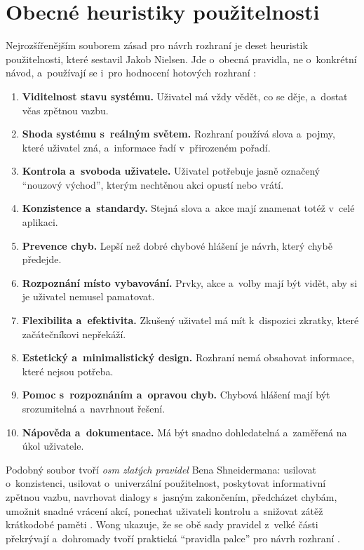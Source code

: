 \section{Obecné heuristiky použitelnosti}\label{sec:ui-heuristiky}

Nejrozšířenějším souborem zásad pro návrh rozhraní je deset heuristik použitelnosti, které sestavil Jakob Nielsen. Jde o~obecná pravidla, ne o~konkrétní návod, a~používají se i~pro hodnocení hotových rozhraní \cite{Nielsen-heuristiky}:
\begin{enumerate}
\item \textbf{Viditelnost stavu systému.} Uživatel má vždy vědět, co se děje, a~dostat včas zpětnou vazbu.
\item \textbf{Shoda systému s~reálným světem.} Rozhraní používá slova a~pojmy, které uživatel zná, a~informace řadí v~přirozeném pořadí.
\item \textbf{Kontrola a~svoboda uživatele.} Uživatel potřebuje jasně označený \enquote{nouzový východ}, kterým nechtěnou akci opustí nebo vrátí.
\item \textbf{Konzistence a~standardy.} Stejná slova a~akce mají znamenat totéž v~celé aplikaci.
\item \textbf{Prevence chyb.} Lepší než dobré chybové hlášení je návrh, který chybě předejde.
\item \textbf{Rozpoznání místo vybavování.} Prvky, akce a~volby mají být vidět, aby si je uživatel nemusel pamatovat.
\item \textbf{Flexibilita a~efektivita.} Zkušený uživatel má mít k~dispozici zkratky, které začátečníkovi nepřekáží.
\item \textbf{Estetický a~minimalistický design.} Rozhraní nemá obsahovat informace, které nejsou potřeba.
\item \textbf{Pomoc s~rozpoznáním a~opravou chyb.} Chybová hlášení mají být srozumitelná a~navrhnout řešení.
\item \textbf{Nápověda a~dokumentace.} Má být snadno dohledatelná a~zaměřená na úkol uživatele.
\end{enumerate}

Podobný soubor tvoří \emph{osm zlatých pravidel} Bena Shneidermana: usilovat o~konzistenci, usilovat o~univerzální použitelnost, poskytovat informativní zpětnou vazbu, navrhovat dialogy s~jasným zakončením, předcházet chybám, umožnit snadné vrácení akcí, ponechat uživateli kontrolu a~snižovat zátěž krátkodobé paměti \cite{Shneiderman-pravidla}. Wong ukazuje, že se obě sady pravidel z~velké části překrývají a~dohromady tvoří praktická \enquote{pravidla palce} pro návrh rozhraní \cite{Wong2025}.

